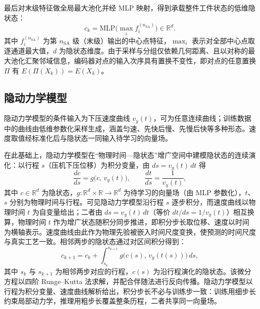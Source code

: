 最后对末级特征做全局最大池化并经 MLP 映射，得到承载整件工件状态的低维隐状态：
\begin{equation}
c_k=\mathrm{MLP}\Big(\max_{i} f_i^{(n_{\text{SA}})}\Big)\in\mathbb{R}^{d} .
\end{equation}
其中 $f_i^{(n_{\text{SA}})}$ 为第 $n_{\text{SA}}$ 级（末级）输出的中心点特征，$\max_i$ 表示对全部中心点取逐通道最大值，$d$ 为隐状态维度。由于采样与分组仅依赖几何距离、且以对称的最大池化汇聚邻域信息，编码器对点的输入次序具有置换不变性，即对点的任意置换 $\Pi$ 有 $E(\Pi(X_k))=E(X_k)$。

\subsection{隐动力学模型}
隐动力学模型的条件输入为下压速度曲线 $v_y(t)$，可为任意连续曲线；训练数据中的曲线由低维参数化采样生成，涵盖匀速、先快后慢、先慢后快等多种形态。速度取值经标准化后与隐状态一同输入待学习的向量场。

在此基础上，隐动力学模型在“物理时间—隐状态”增广空间中建模隐状态的连续演化：以行程 $s$（压机下压位移）为积分变量，由 $ds=v_y(t)\,dt$ 得
\begin{equation}
\frac{dc}{ds}=g\big(c,\,v_y(t)\big),\qquad \frac{dt}{ds}=\frac{1}{v_y(t)} ,
\end{equation}
其中 $c\in\mathbb{R}^{d}$ 为隐状态，$g:\mathbb{R}^{d}\times\mathbb{R}\to\mathbb{R}^{d}$ 为待学习的向量场（由 MLP 参数化），$t$、$s$ 分别为物理时间与行程。可见隐动力学模型沿行程 $s$ 逐步积分，而速度曲线以物理时间 $t$ 为自变量给出；二者由 $ds=v_y(t)\,dt$（等价 $dt/ds=1/v_y(t)$）相互换算，物理时间 $t$ 作为增广状态随积分同步推进，即积分步长取位移、速度以时间为横轴表示。速度曲线由此作为物理先验被嵌入时间尺度变换，使预测的时间尺度与真实工艺一致。相邻两步的隐状态通过对区间积分得到：
\begin{equation}
c_{k+1}=c_k+\int_{s_k}^{s_{k+1}} g\big(c(s),\,v_y(t(s))\big)\,ds ,
\end{equation}
其中 $s_k$ 与 $s_{k+1}$ 为相邻两步对应的行程，$c(s)$ 为沿行程演化的隐状态。该微分方程以四阶 Runge--Kutta 法求解，并配合伴随法进行反向传播。隐动力学模型以行程为积分变量、速度曲线解析给出，积分步长不必与训练步一致：训练用细步长约束局部动力学，推理用粗步长覆盖整条历程，二者共享同一向量场。

